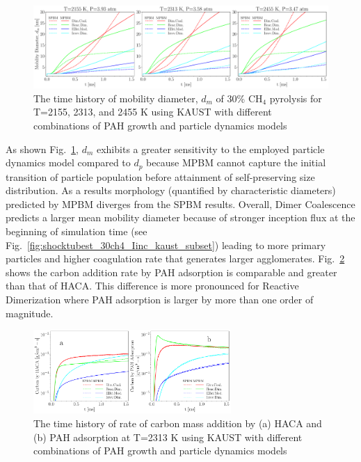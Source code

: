 \begin{figure}[H]
	\centering
	\includegraphics[width=1\textwidth]{Figures/Results/Shocktube/Stanford/june/30CH4_sootdm_kaust_subset.pdf}
	\caption{The time history of mobility diameter, $d_m$ of 30\% $\mathrm{CH_4}$ pyrolysis for T=2155, 2313, and 2455 K using KAUST with different combinations of PAH growth and particle dynamics models}
	\label{fig:shocktubest_30ch4_dm_kaust_subset} 
\end{figure}

As shown Fig.~\ref{fig:shocktubest_30ch4_dm_kaust_subset},  $d_m$ exhibits a greater sensitivity to the employed particle dynamics model compared to $d_p$ because MPBM cannot capture the initial transition of particle population before attainment of self-preserving size distribution. As a results morphology (quantified by characteristic diameters) predicted by MPBM diverges from the SPBM results. Overall, Dimer Coalescence predicts a larger mean mobility diameter because of stronger inception flux at the beginning of simulation time (see Fig.~\ref{fig:shocktubest_30ch4_Iinc_kaust_subset}) leading to more primary particles and higher coagulation rate that generates larger agglomerates. Fig.~\ref{fig:shocktubest_30ch4_Ctot_kaust_single} shows the carbon addition rate by PAH adsorption is comparable and greater than that of HACA. This difference is more pronounced for Reactive Dimerization where PAH adsorption is larger by more than one order of magnitude. 

\begin{figure}[H]
	\centering
	\includegraphics[width=0.67\textwidth]{Figures/Results/Shocktube/Stanford/june/30CH4_sootCtot_kaust_single.pdf}
	\caption{The time history of rate of carbon mass addition by (a) HACA and (b) PAH adsorption at T=2313 K using KAUST with different combinations of PAH growth and particle dynamics models}
	\label{fig:shocktubest_30ch4_Ctot_kaust_single} 
\end{figure}


